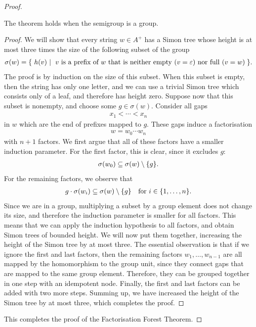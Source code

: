 \begin{proof}
    \begin{lemma}\label{lem:factorisation-forest-group}
        The theorem holds when the semigroup is a group.
    \end{lemma}
    \begin{proof}
        We will show that every string $w \in A^+$ has a Simon tree whose height is at most three times the size of the following  subset of the group
        \begin{align*}
        \sigma(w) = \setbuild{ h(v)}{$v$ is a prefix of $w$ that is neither empty ($v=\varepsilon$) nor full ($v=w$)}. 
        \end{align*}
        The proof is by induction on the size of this subset.
        When this subset is empty, then the string has only one letter, and we can use a  trivial Simon tree which consists only of a leaf, and therefore has height zero. Suppose now that this subset is nonempty, and choose some $g \in \sigma(w)$. Consider all gaps 
        \begin{align*}
        x_1 < \cdots < x_n 
        \end{align*}
        in $w$ which are the end of prefixes mapped to $g$. These gaps induce a factorisation 
        \begin{align*}
        w =  w_0 \cdots w_n
        \end{align*}
        with $n+1$ factors. We first argue that all of these factors have a smaller induction parameter. For the first factor, this is clear, since it excludes $g$: 
        \begin{align*}
        \sigma(w_0) \subseteq \sigma(w) \setminus \{g\}.
        \end{align*}
        For the remaining factors, we observe that 
        \begin{align*}
        g \cdot \sigma(w_i) \subseteq \sigma(w) \setminus \{g\} \quad \text{for $i \in \{1,\ldots,n\}$}.
        \end{align*}
        Since we are in a group, multiplying a subset by a group element does not change its size, and therefore the induction parameter is smaller for all factors. This means that we can apply the induction hypothesis to all factors, and obtain Simon trees of bounded height.  We will now put them together, increasing the height of the Simon tree by at most three. 
        The essential observation is that if we ignore the first and last factors, then the remaining factors  $w_1,\ldots,w_{n-1}$ are all mapped by the homomorphism to the group unit, since they connect gaps that are mapped to the same group element. Therefore, they can be grouped together in one step with an idempotent node. Finally, the first and last factors can be added with two more steps. Summing up, we have increased the height of the Simon tree by at most three, which completes the proof.
    \end{proof}
    This completes the proof of the Factorisation Forest Theorem. 
\end{proof}


